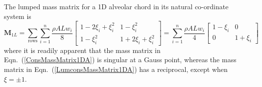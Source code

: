 The lumped mass matrix for a 1D alveolar chord in its natural co-ordinate system is 
\begin{equation}
\mathbf{M}_{1L} = \sum_{\text{rows}} \sum_{i=1}^n \frac{\rho A L w_i}{8} \begin{bmatrix}
1 - 2\xi_i + \xi_i^2 & 1 - \xi_i^2 \\
1 - \xi_i^2 & 1 + 2 \xi_i + \xi_i^2
\end{bmatrix} 
= \sum_{i=1}^n \frac{\rho A L w_i}{4} \begin{bmatrix} 
1 - \xi_i & 0 \\ 0 & 1 + \xi_i \end{bmatrix}
\label{LumconsMassMatrix1DA}
\end{equation}
where it is readily apparent that the mass matrix in Eqn.~(\ref{ConsMassMatrix1DA}) is singular at a Gauss point, whereas the mass matrix in Eqn.~(\ref{LumconsMassMatrix1DA}) has a reciprocal, except when $\xi = \pm 1$. 


